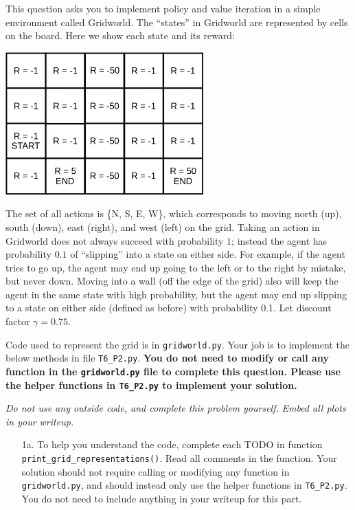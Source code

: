 \documentclass[submit]{harvardml}
\begin{document}
\begin{problem}

This question asks you to implement policy and value iteration in a simple environment called Gridworld.  The ``states'' in Gridworld are represented by cells on the board.  Here we show each state and its reward:

\begin{center}
\includegraphics[width=3in]{gridworld.png}
\end{center}

The set of all actions is \{N, S, E, W\}, which corresponds to moving north (up), south (down), east (right), and west (left) on the grid.  Taking an action in Gridworld does not always succeed with probability $1$; instead the agent has probability $0.1$ of ``slipping'' into a state on either side.  For example, if the agent tries to go up, the agent may end up going to the left or to the right by mistake, but never down.  Moving into a wall (off the edge of the grid) also will keep the agent in the same state with high probability, but the agent may end up slipping to a state on either side (defined as before) with probability 0.1.  Let discount factor $\gamma = 0.75$.

Code used to represent the grid is in \texttt{gridworld.py}.  Your job is to implement the below methods in file \texttt{T6\_P2.py}. \textbf{You do not need to modify or call any function in the \texttt{gridworld.py} file to complete this question.  Please use the helper functions in \texttt{T6\_P2.py} to implement your solution.}

\emph{Do not use any outside code, and complete this problem yourself.}
\emph{Embed all plots in your writeup.}
  
\begin{enumerate}

\item[1a.]To help you understand the code, complete each TODO in function \texttt{print\_grid\_representations()}. Read all comments in the function.  Your solution should not require calling or modifying any function in \texttt{gridworld.py}, and should instead only use the helper functions in \texttt{T6\_P2.py}.  You do not need to include anything in your writeup for this part.


\end{enumerate}
\end{problem}
\end{document}
